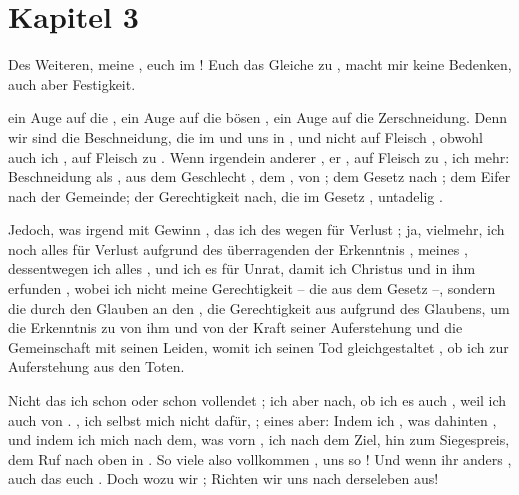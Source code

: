 \section*{Kapitel 3}
Des Weiteren, meine ,  euch  im ! Euch das Gleiche  zu , macht mir keine Bedenken, auch aber  Festigkeit.

 ein Auge auf die ,  ein Auge auf die bösen ,  ein Auge auf die Zerschneidung. Denn wir sind die Beschneidung, die im    und uns in ,  und nicht auf Fleisch , obwohl auch ich , auf Fleisch zu . Wenn irgendein anderer , er , auf Fleisch zu , ich mehr: Beschneidung als , aus dem Geschlecht , dem ,  von ; dem Gesetz nach ; dem Eifer nach  der Gemeinde; der Gerechtigkeit nach, die im Gesetz , untadelig .

Jedoch, was irgend mit Gewinn , das  ich des  wegen für Verlust ; ja, vielmehr, ich  noch alles für Verlust aufgrund des überragenden  der Erkenntnis , meines , dessentwegen ich alles , und ich  es für Unrat, damit ich Christus  und in ihm erfunden , wobei ich nicht meine Gerechtigkeit  -- die aus dem Gesetz --, sondern die durch den Glauben an den , die Gerechtigkeit aus  aufgrund des Glaubens, um die Erkenntnis zu  von ihm und von der Kraft seiner Auferstehung und die Gemeinschaft mit seinen Leiden, womit ich seinen Tod gleichgestaltet , ob ich   zur Auferstehung aus den Toten.

Nicht das ich  schon  oder schon vollendet ; ich   aber nach, ob ich es auch , weil ich  auch  von . , ich selbst  mich nicht dafür,  ; eines aber: Indem ich , was dahinten , und indem ich mich  nach dem, was vorn ,  ich nach dem Ziel, hin zum Siegespreis, dem Ruf  nach oben in . So viele also vollkommen ,  uns so  ! Und wenn ihr anders  , auch das   euch . Doch wozu wir ; Richten wir uns nach derseleben  aus!

